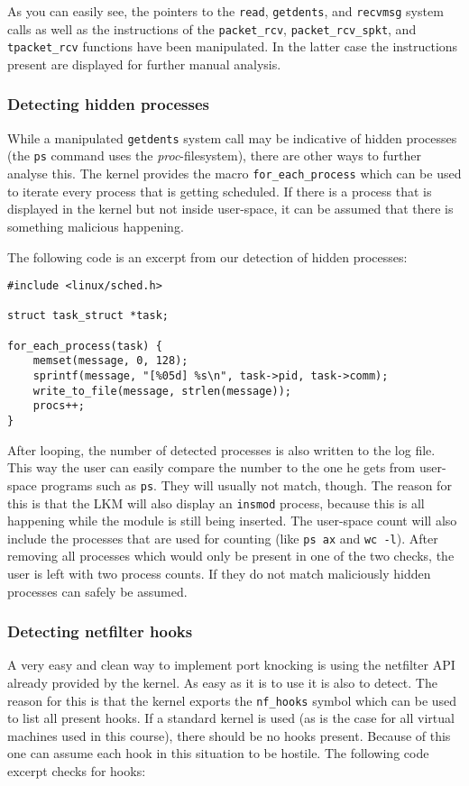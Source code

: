 \documentclass[10pt, letterpaper]{scrartcl}
\begin{document}
As you can easily see, the pointers to the \texttt{read}, \texttt{getdents}, and \texttt{recvmsg} system calls as well as the instructions of the \texttt{packet\_rcv}, \texttt{packet\_rcv\_spkt}, and \texttt{tpacket\_rcv} functions have been manipulated. In the latter case the instructions present are displayed for further manual analysis.

\subsubsection{Detecting hidden processes}
While a manipulated \texttt{getdents} system call may be indicative of hidden processes (the \texttt{ps} command uses the \emph{proc}-filesystem), there are other ways to further analyse this.
The kernel provides the macro \texttt{for\_each\_process} which can be used to iterate every process that is getting scheduled.
If there is a process that is displayed in the kernel but not inside user-space, it can be assumed that there is something malicious happening.

The following code is an excerpt from our detection of hidden processes:

\begin{lstlisting}
#include <linux/sched.h>

struct task_struct *task;

for_each_process(task) {
	memset(message, 0, 128);
	sprintf(message, "[%05d] %s\n", task->pid, task->comm);
	write_to_file(message, strlen(message));
	procs++;
}
\end{lstlisting}

After looping, the number of detected processes is also written to the log file.
This way the user can easily compare the number to the one he gets from user-space programs such as \texttt{ps}.
They will usually not match, though.
The reason for this is that the LKM will also display an \texttt{insmod} process, because this is all happening while the module is still being inserted.
The user-space count will also include the processes that are used for counting (like \texttt{ps ax} and \texttt{wc -l}).
After removing all processes which would only be present in one of the two checks, the user is left with two process counts.
If they do not match maliciously hidden processes can safely be assumed.

\subsubsection{Detecting netfilter hooks}
A very easy and clean way to implement port knocking is using the netfilter API already provided by the kernel.
As easy as it is to use it is also to detect.
The reason for this is that the kernel exports the \texttt{nf\_hooks} symbol which can be used to list all present hooks.
If a standard kernel is used (as is the case for all virtual machines used in this course), there should be no hooks present.
Because of this one can assume each hook in this situation to be hostile.
The following code excerpt checks for hooks:
\end{document}
